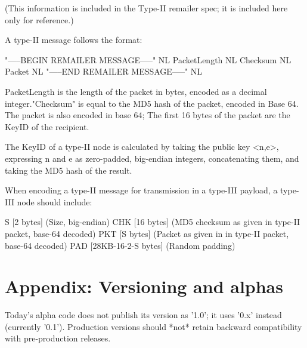 (This information is included in the Type-II remailer spec; it is included
here only for reference.)

A type-II message follows the format:

"-----BEGIN REMAILER MESSAGE-----" NL
PacketLength NL
Checksum NL
Packet NL
"-----END REMAILER MESSAGE-----" NL

PacketLength is the length of the packet in bytes, encoded as a
decimal integer."Checksum" is equal to the MD5 hash of the packet,
encoded in Base 64.  The packet is also encoded in base 64; The first
16 bytes of the packet are the KeyID of the recipient.

The KeyID of a type-II node is calculated by taking the public key
<n,e>, expressing n and e as zero-padded, big-endian integers,
concatenating them, and taking the MD5 hash of the result.

When encoding a type-II message for transmission in a type-III payload,
a type-III node should include:

S   [2 bytes] (Size, big-endian)
CHK [16 bytes] (MD5 checksum as given in type-II packet, base-64 decoded)
PKT [S bytes] (Packet as given in in type-II packet, base-64 decoded)
PAD [28KB-16-2-S bytes] (Random padding)

\section{Appendix: Versioning and alphas}

Today's alpha code does not publish its version as '1.0'; it uses
'0.x' instead (currently '0.1').  Production versions should *not*
retain backward compatibility with pre-production releases.
